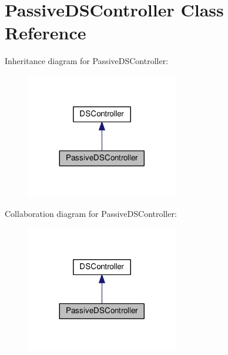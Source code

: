 \hypertarget{classPassiveDSController}{\section{Passive\+D\+S\+Controller Class Reference}
\label{classPassiveDSController}
}


Inheritance diagram for Passive\+D\+S\+Controller\+:\nopagebreak
\begin{figure}[H]
\begin{center}
\leavevmode
\includegraphics[width=188pt]{classPassiveDSController__inherit__graph}
\end{center}
\end{figure}


Collaboration diagram for Passive\+D\+S\+Controller\+:\nopagebreak
\begin{figure}[H]
\begin{center}
\leavevmode
\includegraphics[width=188pt]{classPassiveDSController__coll__graph}
\end{center}
\end{figure}
